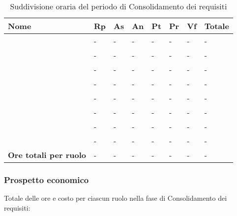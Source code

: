 		\begin{longtable}{ 
			>{\centering}p{} 
			>{\centering}p{}
			>{\centering}p{} 
			>{\centering}p{} 
			>{\centering}p{}
			>{\centering}p{} 
			>{\centering}p{}
			>{\centering\arraybackslash}p{} }
	
			\caption {Suddivisione oraria del periodo di Consolidamento dei requisiti}		\\
			
			\textbf{\color{white}Nome} & 
			\textbf{\color{white}Rp} & 
			\textbf{\color{white}As} & 
			\textbf{\color{white}An} &
			\textbf{\color{white}Pt} &
			\textbf{\color{white}Pr} &
			\textbf{\color{white}Vf} &
			\textbf{\color{white}Totale}
			\tabularnewline  
			\endhead
			
			\VB & - & - & - & - & - & - & - \\
			\LB & - & - & - & - & - & - & - \\
			\NF & - & - & - & - & - & - & - \\
			\EG & - & - & - & - & - & - & - \\
			\FJ & - & - & - & - & - & - & - \\
			\MP & - & - & - & - & - & - & - \\
			\AS & - & - & - & - & - & - & - \\
			\AZ & - & - & - & - & - & - & - \\
			\textbf{Ore totali per ruolo} & - & - & - & - & - & - & - \\
		\end{longtable}
		
	\subsubsection{Prospetto economico}
		Totale delle ore e costo per ciascun ruolo nella fase di Consolidamento dei requisiti:
		
